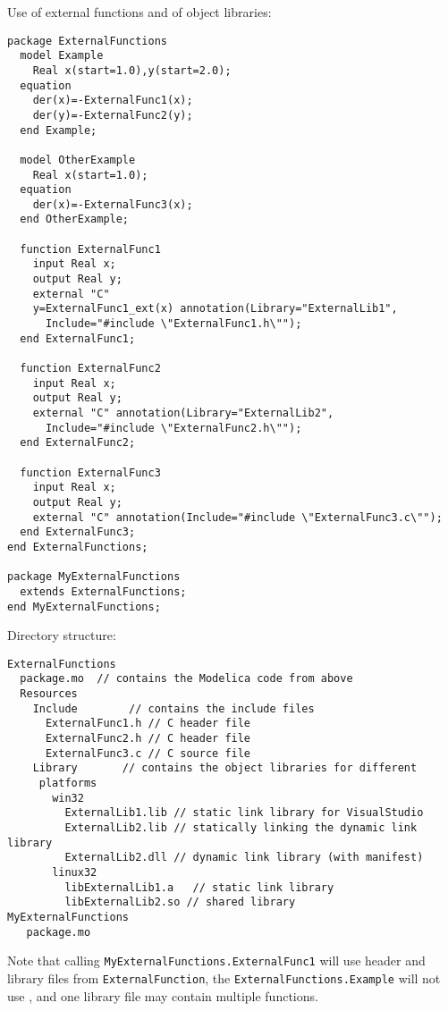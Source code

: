 \begin{example}
Use of external functions and of object libraries:
\begin{lstlisting}[language=modelica]
package ExternalFunctions
  model Example
    Real x(start=1.0),y(start=2.0);
  equation
    der(x)=-ExternalFunc1(x);
    der(y)=-ExternalFunc2(y);
  end Example;

  model OtherExample
    Real x(start=1.0);
  equation
    der(x)=-ExternalFunc3(x);
  end OtherExample;

  function ExternalFunc1
    input Real x;
    output Real y;
    external "C"
    y=ExternalFunc1_ext(x) annotation(Library="ExternalLib1",
      Include="#include \"ExternalFunc1.h\"");
  end ExternalFunc1;

  function ExternalFunc2
    input Real x;
    output Real y;
    external "C" annotation(Library="ExternalLib2",
      Include="#include \"ExternalFunc2.h\"");
  end ExternalFunc2;

  function ExternalFunc3
    input Real x;
    output Real y;
    external "C" annotation(Include="#include \"ExternalFunc3.c\"");
  end ExternalFunc3;
end ExternalFunctions;

package MyExternalFunctions
  extends ExternalFunctions;
end MyExternalFunctions;
\end{lstlisting}
Directory structure:
\begin{lstlisting}[language=modelica]
ExternalFunctions
  package.mo  // contains the Modelica code from above
  Resources
    Include        // contains the include files
      ExternalFunc1.h // C header file
      ExternalFunc2.h // C header file
      ExternalFunc3.c // C source file
    Library       // contains the object libraries for different
     platforms
       win32
         ExternalLib1.lib // static link library for VisualStudio
         ExternalLib2.lib // statically linking the dynamic link library
         ExternalLib2.dll // dynamic link library (with manifest)
       linux32
         libExternalLib1.a   // static link library
         libExternalLib2.so // shared library
MyExternalFunctions
   package.mo
\end{lstlisting}
Note that calling \lstinline!MyExternalFunctions.ExternalFunc1! will use
header and library files from \lstinline!ExternalFunction!, the \lstinline!ExternalFunctions.Example! will not use ,
and one library file may contain multiple functions.


\end{example}
